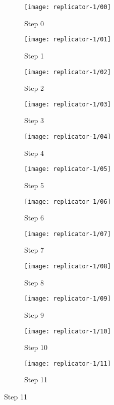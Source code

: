 \begin{figure}[!ht]
    \centering
    \begin{subfigure}{0.32\textwidth}
        \centering
        \texttt{[image: replicator-1/00]}
        \caption{Step 0}
    \end{subfigure}
    \begin{subfigure}{0.32\textwidth}
        \centering
        \texttt{[image: replicator-1/01]}
        \caption{Step 1}
    \end{subfigure}
    \begin{subfigure}{0.32\textwidth}
        \centering
        \texttt{[image: replicator-1/02]}
        \caption{Step 2}
    \end{subfigure}
    \begin{subfigure}{0.32\textwidth}
        \centering
        \texttt{[image: replicator-1/03]}
        \caption{Step 3}
    \end{subfigure}
    \begin{subfigure}{0.32\textwidth}
        \centering
        \texttt{[image: replicator-1/04]}
        \caption{Step 4}
    \end{subfigure}
    \begin{subfigure}{0.32\textwidth}
        \centering
        \texttt{[image: replicator-1/05]}
        \caption{Step 5}
    \end{subfigure}
    \begin{subfigure}{0.32\textwidth}
        \centering
        \texttt{[image: replicator-1/06]}
        \caption{Step 6}
    \end{subfigure}
    \begin{subfigure}{0.32\textwidth}
        \centering
        \texttt{[image: replicator-1/07]}
        \caption{Step 7}
    \end{subfigure}
    \begin{subfigure}{0.32\textwidth}
        \centering
        \texttt{[image: replicator-1/08]}
        \caption{Step 8}
    \end{subfigure}
    \begin{subfigure}{0.32\textwidth}
        \centering
        \texttt{[image: replicator-1/09]}
        \caption{Step 9}
    \end{subfigure}
    \begin{subfigure}{0.32\textwidth}
        \centering
        \texttt{[image: replicator-1/10]}
        \caption{Step 10}
    \end{subfigure}
    \begin{subfigure}{0.32\textwidth}
        \centering
        \texttt{[image: replicator-1/11]}
        \caption{Step 11}
    \end{subfigure}
\end{figure}

